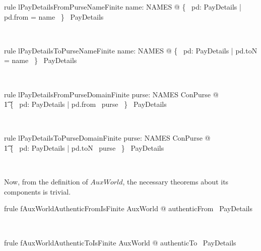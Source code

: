 \begin{LNewLemma}
\begin{theorem}{rule lPayDetailsFromPurseNameFinite}
    \forall name: NAMES @ \{~  pd: PayDetails | pd.from = name ~\} \in \finset~PayDetails
\end{theorem}~\end{LNewLemma}

\begin{LNewLemma}
\begin{theorem}{rule lPayDetailsToPurseNameFinite}
    \forall name: NAMES @ \{~  pd: PayDetails | pd.toN = name ~\} \in \finset~PayDetails
\end{theorem}~\end{LNewLemma}

\begin{LNewLemma}
\begin{theorem}{rule lPayDetailsFromPurseDomainFinite}
    \forall purse: NAMES \finj ConPurse  @ \\
        \t1 \{~  pd: PayDetails | pd.from \in \dom~purse ~\} \in \finset~PayDetails
\end{theorem}~\end{LNewLemma}

\begin{LNewLemma}
\begin{theorem}{rule lPayDetailsToPurseDomainFinite}
    \forall purse: NAMES \finj ConPurse  @ \\
        \t1 \{~  pd: PayDetails | pd.toN \in \dom~purse ~\} \in \finset~PayDetails
\end{theorem}~\end{LNewLemma}


Now, from the definition of $AuxWorld$, the necessary theorems about its components is trivial.
%
\begin{LFRT}
\begin{theorem}{frule fAuxWorldAuthenticFromIsFinite}
   \forall AuxWorld @ authenticFrom \in \finset~PayDetails
\end{theorem}~\end{LFRT}
%
\begin{LFRT}
\begin{theorem}{frule fAuxWorldAuthenticToIsFinite}
   \forall AuxWorld @ authenticTo \in \finset~PayDetails
\end{theorem}~\end{LFRT}

